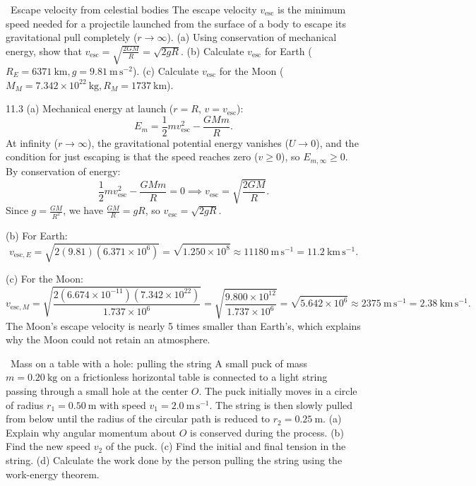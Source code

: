 \begin{exercise}{\warm\ Escape velocity from celestial bodies}
The escape velocity $v_{\text{esc}}$ is the minimum speed needed for a projectile launched from the surface of a body to escape its gravitational pull completely ($r \to \infty$).
(a) Using conservation of mechanical energy, show that $v_{\text{esc}} = \sqrt{\frac{2GM}{R}} = \sqrt{2gR}$.
(b) Calculate $v_{\text{esc}}$ for Earth ($R_E = 6371\ \mathrm{km}, g = 9.81\ \mathrm{m\,s^{-2}}$).
(c) Calculate $v_{\text{esc}}$ for the Moon ($M_M = 7.342\times 10^{22}\ \mathrm{kg}, R_M = 1737\ \mathrm{km}$).
\end{exercise}

\begin{tabletworkspace}[5.0cm]
\end{tabletworkspace}

\begin{solution}{11.3}
(a) Mechanical energy at launch ($r = R$, $v = v_{\text{esc}}$):
\[
E_m = \frac{1}{2}m v_{\text{esc}}^2 - \frac{GMm}{R}.
\]
At infinity ($r \to \infty$), the gravitational potential energy vanishes ($U \to 0$), and the condition for just escaping is that the speed reaches zero ($v \ge 0$), so $E_{m, \infty} \ge 0$.
By conservation of energy:
\[
\frac{1}{2}m v_{\text{esc}}^2 - \frac{GMm}{R} = 0 \implies \boxed{v_{\text{esc}} = \sqrt{\frac{2GM}{R}}.}
\]
Since $g = \frac{GM}{R^2}$, we have $\frac{GM}{R} = gR$, so $v_{\text{esc}} = \sqrt{2gR}$.

(b) For Earth:
\[
v_{\text{esc}, E} = \sqrt{2(9.81)(6.371\times 10^6)} = \sqrt{1.250\times 10^8} \approx 11180\ \mathrm{m\,s^{-1}} = \mathbf{11.2\ \mathrm{km\,s^{-1}}.}
\]

(c) For the Moon:
\[
v_{\text{esc}, M} = \sqrt{\frac{2(6.674\times 10^{-11})(7.342\times 10^{22})}{1.737\times 10^6}} = \sqrt{\frac{9.800\times 10^{12}}{1.737\times 10^6}} = \sqrt{5.642\times 10^6} \approx 2375\ \mathrm{m\,s^{-1}} = \mathbf{2.38\ \mathrm{km\,s^{-1}}.}
\]
The Moon's escape velocity is nearly 5 times smaller than Earth's, which explains why the Moon could not retain an atmosphere.
\end{solution}

\begin{exercise}{\core\ Mass on a table with a hole: pulling the string}
A small puck of mass $m=0.20\ \mathrm{kg}$ on a frictionless horizontal table is connected to a light string passing through a small hole at the center $O$. The puck initially moves in a circle of radius $r_1 = 0.50\ \mathrm{m}$ with speed $v_1 = 2.0\ \mathrm{m\,s^{-1}}$. The string is then slowly pulled from below until the radius of the circular path is reduced to $r_2 = 0.25\ \mathrm{m}$.
(a) Explain why angular momentum about $O$ is conserved during the process.
(b) Find the new speed $v_2$ of the puck.
(c) Find the initial and final tension in the string.
(d) Calculate the work done by the person pulling the string using the work-energy theorem.
\end{exercise}

